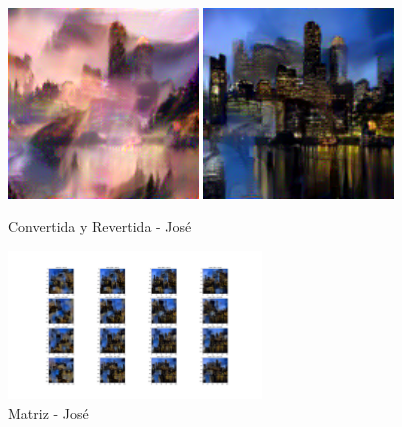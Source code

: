 \documentclass[es]{uc3mreport}
\begin{document}
\begin{report}
    \begin{figure}
        \includegraphics[width=0.45\textwidth]{img/jose-converted.png}
        \includegraphics[width=0.45\textwidth]{img/jose-reverse.png}
        \caption{Convertida y Revertida - José}
        \label{jose-1}
    \end{figure}

    \begin{figure}
        \centering
        \includegraphics[width=0.6\textwidth]{img/matriz.png}
        \caption{Matriz - José}
        \label{jose-2}
    \end{figure}

    \end{report}



\end{document}
